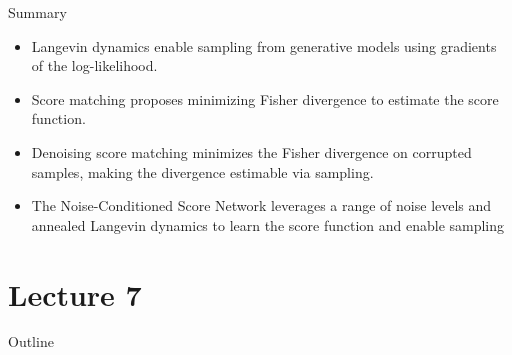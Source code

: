 \documentclass{beamer}
\begin{document}
\begin{frame}{Summary}
	\begin{itemize}
		\item Langevin dynamics enable sampling from generative models using gradients of the log-likelihood.
		\vfill
		\item Score matching proposes minimizing Fisher divergence to estimate the score function.
		\vfill
		\item Denoising score matching minimizes the Fisher divergence on corrupted samples, making the divergence estimable via sampling.
		\vfill 
		\item The Noise-Conditioned Score Network leverages a range of noise levels and annealed Langevin dynamics to learn the score function and enable sampling	
	\end{itemize}
\end{frame}

\part{Lecture 7}

\begin{frame}
	\titlepage
	\resetonslide	
\end{frame}






\begin{frame}{Outline}
	\tableofcontents[part=7]
\end{frame}
\end{document}
